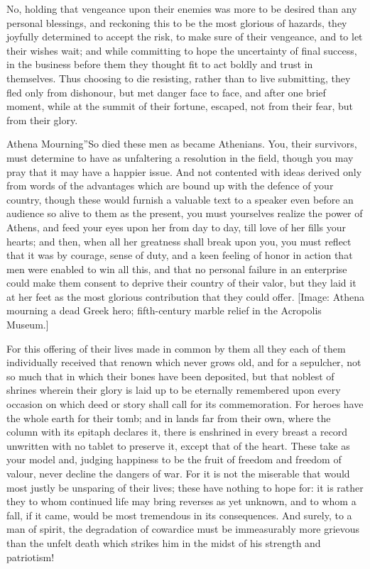 \documentclass[a4paper]{amsbook}
\begin{document}
No, holding that vengeance upon their enemies was more to be desired than any personal blessings, and reckoning this to be the most glorious of hazards, they joyfully determined to accept the risk, to make sure of their vengeance, and to let their wishes wait; and while committing to hope the uncertainty of final success, in the business before them they thought fit to act boldly and trust in themselves. Thus choosing to die resisting, rather than to live submitting, they fled only from dishonour, but met danger face to face, and after one brief moment, while at the summit of their fortune, escaped, not from their fear, but from their glory.

Athena Mourning”So died these men as became Athenians. You, their survivors, must determine to have as unfaltering a resolution in the field, though you may pray that it may have a happier issue. And not contented with ideas derived only from words of the advantages which are bound up with the defence of your country, though these would furnish a valuable text to a speaker even before an audience so alive to them as the present, you must yourselves realize the power of Athens, and feed your eyes upon her from day to day, till love of her fills your hearts; and then, when all her greatness shall break upon you, you must reflect that it was by courage, sense of duty, and a keen feeling of honor in action that men were enabled to win all this, and that no personal failure in an enterprise could make them consent to deprive their country of their valor, but they laid it at her feet as the most glorious contribution that they could offer. [Image: Athena mourning a dead Greek hero; fifth-century marble relief in the Acropolis Museum.]

For this offering of their lives made in common by them all they each of them individually received that renown which never grows old, and for a sepulcher, not so much that in which their bones have been deposited, but that noblest of shrines wherein their glory is laid up to be eternally remembered upon every occasion on which deed or story shall call for its commemoration. For heroes have the whole earth for their tomb; and in lands far from their own, where the column with its epitaph declares it, there is enshrined in every breast a record unwritten with no tablet to preserve it, except that of the heart. These take as your model and, judging happiness to be the fruit of freedom and freedom of valour, never decline the dangers of war. For it is not the miserable that would most justly be unsparing of their lives; these have nothing to hope for: it is rather they to whom continued life may bring reverses as yet unknown, and to whom a fall, if it came, would be most tremendous in its consequences. And surely, to a man of spirit, the degradation of cowardice must be immeasurably more grievous than the unfelt death which strikes him in the midst of his strength and patriotism!
\end{document}
